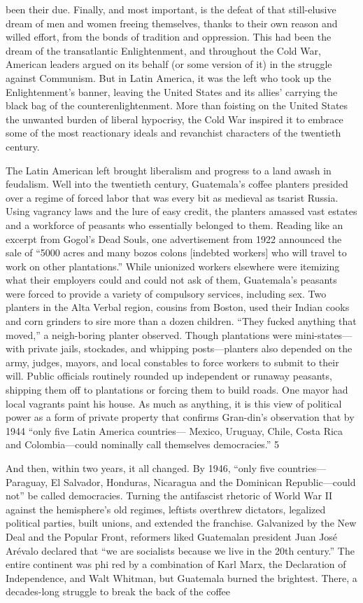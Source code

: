 been their due. Finally, and most important, is the defeat of that still-elusive dream of men and women freeing themselves, thanks to their own reason and willed effort, from the bonds of tradition and oppression. This had been the dream of the transatlantic Enlightenment, and throughout the Cold War, American leaders argued on its behalf (or some version of it) in the struggle against Communism. But in Latin America, it was the left who took up the Enlightenment’s banner, leaving the United States and its allies' carrying the black bag of the counterenlightenment. More than foisting on the United States the unwanted burden of liberal hypocrisy, the Cold War inspired it to embrace some of the most reactionary ideals and revanchist characters of the twentieth century.{\par} The Latin American left brought liberalism and progress to a land awash in feudalism. Well into the twentieth century, Guatemala’s coffee planters presided over a regime of forced labor that was every bit as medieval as tsarist Russia. Using vagrancy laws and the lure of easy credit, the planters amassed vast estates and a workforce of peasants who essentially belonged to them. Reading like an excerpt from Gogol’s Dead Souls, one advertisement from 1922 announced the sale of “5000 acres and many bozos colons [indebted workers] who will travel to work on other plantations.” While unionized workers elsewhere were itemizing what their employers could and could not ask of them, Guatemala’s peasants were forced to provide a variety of compulsory services, including sex. Two planters in the Alta Verbal region, cousins from Boston, used their Indian cooks and corn grinders to sire more than a dozen children. “They fucked anything that moved,” a neigh-boring planter observed. Though plantations were mini-states— with private jails, stockades, and whipping posts—planters also depended on the army, judges, mayors, and local constables to force workers to submit to their will. Public officials routinely rounded up independent or runaway peasants, shipping them off to plantations or forcing them to build roads. One mayor had local vagrants paint his house. As much as anything, it is this view of political power as a form of private property that confirms Gran-din’s observation that by 1944 “only five Latin America countries— Mexico, Uruguay, Chile, Costa Rica and Colombia—could nominally call themselves democracies.” {\color{blue} 5 } {\par} And then, within two years, it all changed. By 1946, “only five countries—Paraguay, El Salvador, Honduras, Nicaragua and the Dominican Republic—could not” be called democracies. Turning the antifascist rhetoric of World War II against the hemisphere’s old regimes, leftists overthrew dictators, legalized political parties, built unions, and extended the franchise. Galvanized by the New Deal and the Popular Front, reformers liked Guatemalan president Juan José Arévalo declared that “we are socialists because we live in the 20th century.” The entire continent was phi red by a combination of Karl Marx, the Declaration of Independence, and Walt Whitman, but Guatemala burned the brightest. There, a decades-long struggle to break the back of the coffee 